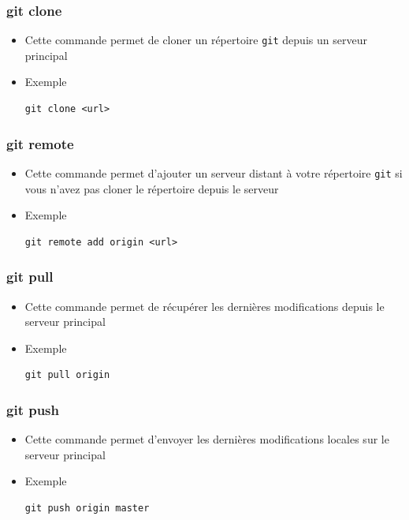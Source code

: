 \documentclass{beamer}
\begin{document}
\begin{frame}[fragile]
\frametitle{git clone}

\begin{itemize}
\item Cette commande permet de cloner un répertoire \texttt{git} depuis un serveur principal
\item Exemple
\begin{lstlisting}
git clone <url>
\end{lstlisting}
\end{itemize}
\end{frame}

\begin{frame}[fragile]
\frametitle{git remote}

\begin{itemize}
\item Cette commande permet d'ajouter un serveur distant à votre répertoire \texttt{git} si vous n'avez pas cloner le répertoire depuis le serveur
\item Exemple
\begin{lstlisting}
git remote add origin <url>
\end{lstlisting}
\end{itemize}
\end{frame}


\begin{frame}[fragile]
\frametitle{git pull}

\begin{itemize}
\item Cette commande permet de récupérer les dernières modifications depuis le serveur principal
\item Exemple
\begin{lstlisting}
git pull origin
\end{lstlisting}
\end{itemize}
\end{frame}

\begin{frame}[fragile]
\frametitle{git push}

\begin{itemize}
\item Cette commande permet d'envoyer les dernières modifications locales sur le serveur principal
\item Exemple
\begin{lstlisting}
git push origin master
\end{lstlisting}
\end{itemize}
\end{frame}

\end{document}
